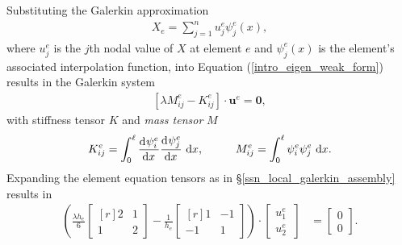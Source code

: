 Substituting the Galerkin approximation
\begin{align*}
  X_e = \sum_{j=1}^n u_j^e \psi_j^e(x),
\end{align*}
where $u_j^e$ is the $j$th nodal value of $X$ at element $e$ and $\psi_j^e(x)$ is the element's associated interpolation function, into Equation (\ref{intro_eigen_weak_form}) results in the Galerkin system
\begin{align*}
  \left[ \lambda M_{ij}^e - K_{ij}^e \right] \cdot \mathbf{u}^e = \mathbf{0},
\end{align*}
with stiffness tensor $K$ and  \emph{mass tensor} $M$
\begin{align*}
  K_{ij}^e = \int_0^{\ell} \totder{\psi_i^e}{x} \totder{\psi_j^e}{x} \d{x}, \hspace{10mm} M_{ij}^e = \int_0^{\ell} \psi_i^e \psi_j^e \d{x}.
\end{align*}
Expanding the element equation tensors as in \S \ref{ssn_local_galerkin_assembly} results in
\begin{align*}
  \left( \frac{\lambda h_e}{6} \begin{bmatrix}[r]
                                 2 & 1 \\
                                 1 & 2
                               \end{bmatrix}
         - \frac{1}{h_e} \begin{bmatrix}[r]
                            1 & -1 \\
                           -1 & 1
                         \end{bmatrix}
  \right) \cdot
  \begin{bmatrix}
    u_1^e \\
    u_2^e\
  \end{bmatrix} &=
  \begin{bmatrix}
    0 \\
    0
  \end{bmatrix}.
\end{align*}

